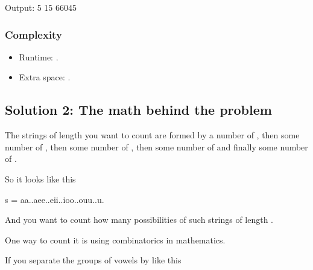 \documentclass[letterpaper,12pt,english]{book}
\begin{document}
\begin{sphinxVerbatim}[commandchars=\\\{\}]
Output:
5
15
66045
\end{sphinxVerbatim}


\subsubsection{Complexity}
\label{\detokenize{Mathematics/09_MTH_1641_Count_Sorted_Vowel_Strings:complexity}}\begin{itemize}
\item {} 
\sphinxAtStartPar
Runtime: .

\item {} 
\sphinxAtStartPar
Extra space: .

\end{itemize}


\subsection{Solution 2: The math behind the problem}
\label{\detokenize{Mathematics/09_MTH_1641_Count_Sorted_Vowel_Strings:solution-2-the-math-behind-the-problem}}
\sphinxAtStartPar
The strings of length  you want to count are formed by a number of , then some number of , then some number of  , then some number of  and finally some number of .

\sphinxAtStartPar
So it looks like this

\begin{sphinxVerbatim}[commandchars=\\\{\}]
s = \PYGZdq{}aa..aee..eii..ioo..ouu..u\PYGZdq{}.
\end{sphinxVerbatim}

\sphinxAtStartPar
And you want to count how many possibilities of such strings of length .

\sphinxAtStartPar
One way to count it is using combinatorics in mathematics.

\sphinxAtStartPar
If you separate the groups of vowels by \sphinxcode{\sphinxupquote{\textquotesingle{}|\textquotesingle{}}} like this
\end{document}
